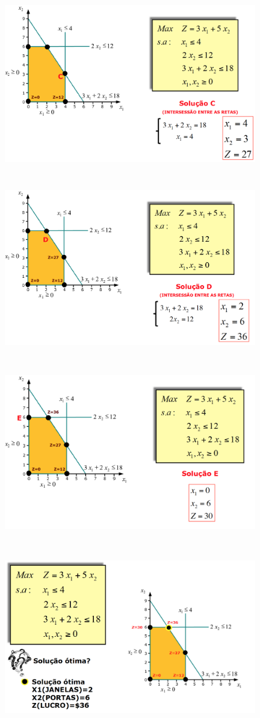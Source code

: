\documentclass{beamer}
\begin{document}
\begin{frame}
	{
		\includegraphics[width=11cm,height=8cm]{Tabajara_05.png}
	}
	\only<5>
	{
		\includegraphics[width=11cm,height=8cm]{Tabajara_06.png}
	}
	\only<6>
	{
		\includegraphics[width=11cm,height=8cm]{Tabajara_07.png}
	}
	\only<7>
	{
		\includegraphics[width=11cm,height=8cm]{Tabajara_08.png}
}
\end{frame}
\end{document}
